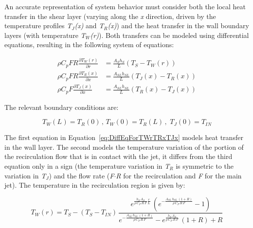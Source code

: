 An accurate representation of system behavior must consider both the local heat transfer in the shear layer (varying along the \emph{x} direction, driven by the temperature profiles \emph{T\(_{J}\)(x)} and \emph{T\(_{R}\)(x)}) and the heat transfer in the wall boundary layers (with temperature \emph{T\(_{W}\)(r)}). Both transfers can be modeled using differential equations, resulting in the following system of equations:

\begin{equation}
  \begin{array}{rl}
    \rho C_p F R \frac{\partial T_W \left(r\right)}{\partial r} & = \frac{A_S h_S}{L} \left(T_S - T_W \left(r\right)\right) \\
    \rho C_p F R \frac{\partial T_R \left(x\right)}{\partial x} & = \frac{A_{SL} h_{SL}}{L} \left(T_J\left(x\right) - T_R \left(x\right)\right) \\
    \rho C_p F \frac{\partial T_J \left(x\right)}{\partial x} & = \frac{A_{SL} h_{SL}}{L} \left(T_R\left(x\right) - T_J \left(x\right)\right)
  \end{array}
  \label{eq:DiffEqForTWrTRxTJx}
\end{equation}

The relevant boundary conditions are:

\begin{equation}
{T_W}({L_{}}) = {T_R}(0)\,,\,{T_W}(0) = {T_R}(L)\,,\,\,{T_J}(0) = {T_{IN}}
\end{equation}

The first equation in Equation~\ref{eq:DiffEqForTWrTRxTJx} models heat transfer in the wall layer. The second models the temperature variation of the portion of the recirculation flow that is in contact with the jet, it differs from the third equation only in a sign (the temperature variation in \emph{T\(_{R}\)} is symmetric to the variation in \emph{T\(_{J}\)}) and the flow rate (\emph{F\(\cdot\)R} for the recirculation and \emph{F} for the main jet). The temperature in the recirculation region is given by:

\begin{equation}
{T_W}(r) = {T_S} - ({T_S} - {T_{IN}})\,\frac{{{e^{\frac{{{h_S}\,{A_S}}}{{\rho \,{C_P}\,R\,F}}\frac{r}{{{L_{}}}}}}\,({e^{ - \frac{{{A_{SL}}\,{h_{SL}}\,(1 + R)}}{{\rho \,{C_P}\,R\,F}}}} - 1)}}{{{e^{ - \frac{{{A_{SL}}\,{h_{SL}}\,(1 + R)}}{{\rho \,{C_P}\,R\,F}}}} - {e^{\frac{{{h_S}\,{A_S}}}{{\rho \,{C_P}\,R\,F}}}}\,(1 + R) + R}}
\end{equation}


